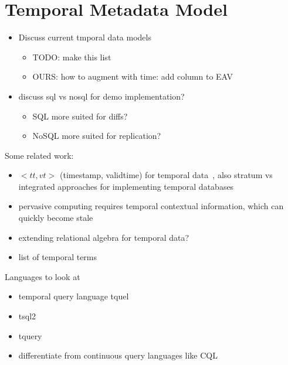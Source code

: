 \section{Temporal Metadata Model} \label{section:temporal}

\begin{itemize}
\item Discuss current tmporal data models
    \begin{itemize}
    \item TODO: make this list
    \item OURS: how to augment with time: add column to EAV
    \end{itemize}
\item discuss sql vs nosql for demo implementation?
    \begin{itemize}
    \item SQL more suited for diffs?
    \item NoSQL more suited for replication?
    \end{itemize}
\end{itemize}

Some related work:
\begin{itemize}
\item $<tt, vt>$ (timestamp, validtime) for temporal data~\cite{jensen1999temporal},
also stratum vs integrated approaches for implementing temporal databases
\item pervasive computing requires temporal contextual information, which
can quickly become stale~\cite{henricksen2002modeling}
\item extending relational algebra for temporal data?~\cite{lorentzos1988extending}
\item list of temporal terms~\cite{dyreson1994consensus}
\end{itemize}
Languages to look at
\begin{itemize}
\item temporal query language tquel~\cite{snodgrass1987temporal}
\item tsql2~\cite{snodgrass2012tsql2}
\item tquery~\cite{kahn1991tquery}
\item differentiate from continuous query languages like CQL~\cite{arasu2006cql}
\end{itemize}

